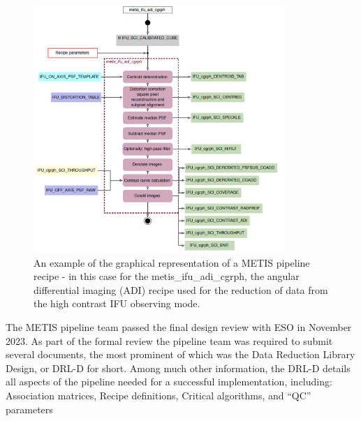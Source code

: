 \documentclass[a4paper]{spie}  %
\begin{document}
\begin{figure}
    \centering
    \includegraphics[width=0.85\textwidth]{SPIE_paper/figures/metis_ifu_adi_cgrph_recipe.png}
    \caption{An example of the graphical representation of a METIS pipeline recipe - in this case for the metis\_ifu\_adi\_cgrph, the angular differential imaging (ADI) recipe used for the reduction of data from the high contrast IFU observing mode.}
    \label{fig:recipe_example}
\end{figure}

The METIS pipeline team passed the final design review with ESO in November 2023. 
As part of the formal review the pipeline team was required to submit several documents, the most prominent of which was the Data Reduction Library Design, or DRL-D for short\cite{DRLD}.
Among much other information, the DRL-D details all aspects of the pipeline needed for a successful implementation, including: Association matrices, Recipe definitions, Critical algorithms, and ``QC'' parameters
\end{document}
